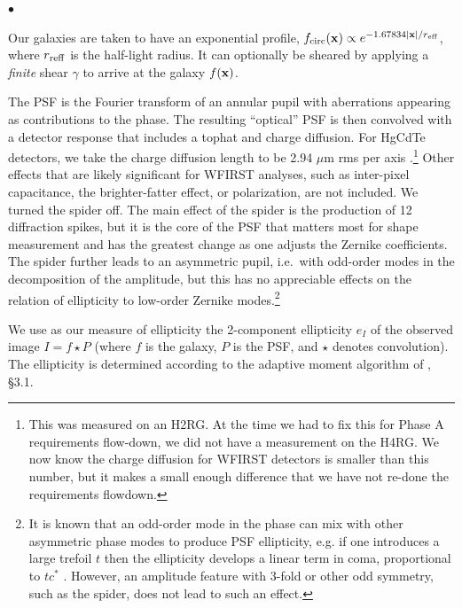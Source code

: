 \documentclass[usenatbib]{mnras}
\begin{document}
\begin{list}{$\bullet$}{}
\item Our galaxies are taken to have an exponential profile, $f_{\rm circ}({\bf x}) \propto e^{-1.67834|{\bf x}|/r_{\rm eff}}$, where $r_{\rm reff}$ is the half-light radius. It can optionally be sheared by applying a {\em finite} shear $\gamma$ to arrive at the galaxy $f({\bf x})$.
\item The PSF is the Fourier transform of an
annular pupil with aberrations appearing as contributions to the
phase. The resulting ``optical'' PSF is then convolved with a detector
response that includes a tophat and charge diffusion. For HgCdTe
detectors, we take the charge diffusion length to be 2.94 $\mu$m rms
per axis \citep{2007PASP..119..466B}.\footnote{This was measured on an H2RG. At the time we had to fix this for Phase A requirements
flow-down, we did not have a measurement on the H4RG. We now know the charge diffusion for WFIRST detectors is smaller than this number, but it makes a small enough difference that we have not re-done the requirements flowdown.} Other effects that are likely significant for WFIRST analyses, such as inter-pixel capacitance, the brighter-fatter effect, or polarization, are not included. We turned the spider off. The main effect of the spider is the production of 12 diffraction spikes, but it is the core of the PSF that matters most for shape measurement and has the greatest change as one adjusts the Zernike coefficients. The spider further leads to an asymmetric pupil, i.e.\ with odd-order modes in the decomposition of the amplitude, but this has no appreciable effects on the relation of ellipticity to low-order Zernike modes.\footnote{It is known that an odd-order mode in the phase can
mix with other asymmetric phase modes to produce PSF ellipticity,
e.g. if one introduces a large trefoil $t$ then the ellipticity
develops a linear term in coma, proportional to $tc^\ast$
\citep{2010SPIE.7731E..1EN}. However, an amplitude feature with 3-fold
or other odd symmetry, such as the spider, does not lead to such an
effect.}
\item We use as our measure of ellipticity the 2-component ellipticity $e_I$ of the observed image $I = f \star P$ (where $f$ is the galaxy, $P$ is the PSF, and $\star$ denotes convolution). The ellipticity is determined according to the adaptive moment algorithm of \cite{2002AJ....123..583B}, \S3.1.
\end{list}
\end{document}
